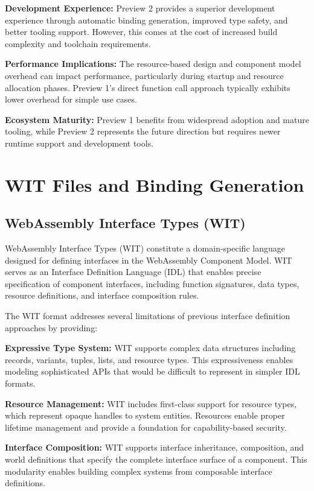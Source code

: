 \textbf{Development Experience:} Preview 2 provides a superior development experience through automatic binding generation, improved type safety, and better tooling support. However, this comes at the cost of increased build complexity and toolchain requirements.

\textbf{Performance Implications:} The resource-based design and component model overhead can impact performance, particularly during startup and resource allocation phases. Preview 1's direct function call approach typically exhibits lower overhead for simple use cases.

\textbf{Ecosystem Maturity:} Preview 1 benefits from widespread adoption and mature tooling, while Preview 2 represents the future direction but requires newer runtime support and development tools.

\section{WIT Files and Binding Generation}
\label{sec:wit-binding}

\subsection{WebAssembly Interface Types (WIT)}
\label{subsec:wit-overview}

WebAssembly Interface Types (WIT) constitute a domain-specific language designed for defining interfaces in the WebAssembly Component Model\cite{wit_specification}. WIT serves as an Interface Definition Language (IDL) that enables precise specification of component interfaces, including function signatures, data types, resource definitions, and interface composition rules.

The WIT format addresses several limitations of previous interface definition approaches by providing:

\textbf{Expressive Type System:} WIT supports complex data structures including records, variants, tuples, lists, and resource types. This expressiveness enables modeling sophisticated APIs that would be difficult to represent in simpler IDL formats.

\textbf{Resource Management:} WIT includes first-class support for resource types, which represent opaque handles to system entities. Resources enable proper lifetime management and provide a foundation for capability-based security.

\textbf{Interface Composition:} WIT supports interface inheritance, composition, and world definitions that specify the complete interface surface of a component. This modularity enables building complex systems from composable interface definitions.

